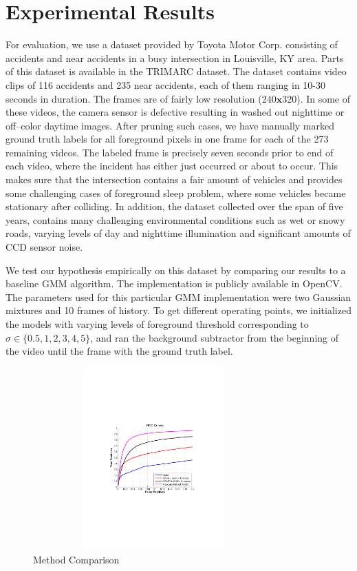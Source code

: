 \documentclass{article}
\begin{document}
\section{Experimental Results}
For evaluation, we use a dataset provided by Toyota Motor Corp. consisting of accidents and near accidents in a busy intersection in Louisville, KY area.  Parts of this dataset is available in the TRIMARC dataset\cite{toyota_dataset}.  The dataset contains video clips of 116 accidents and 235 near accidents, each of them ranging in 10-30 seconds in duration.  The frames are of fairly low resolution (240$\mathbf{x}$320). In some of these videos, the camera sensor is defective resulting in washed out nighttime or off--color daytime images.  After pruning such cases, we have manually marked ground truth labels for all foreground pixels in one frame for each of the 273 remaining videos.  The labeled frame is precisely seven seconds prior to end of each video, where the incident has either just occurred or about to occur.  This makes sure that the intersection contains a fair amount of vehicles and provides some challenging cases of foreground sleep problem, where some vehicles became stationary after colliding.  In addition, the dataset collected over the span of five years, contains many challenging environmental conditions such as wet or snowy roads, varying levels of day and nighttime illumination and significant amounts of CCD sensor noise.

We test our hypothesis empirically on this dataset by comparing our results to a baseline GMM\cite{ZivGMM} algorithm.  The implementation is publicly available in OpenCV\cite{opencv_library}.  The parameters used for this particular GMM implementation were two Gaussian mixtures and 10 frames of history.  To get different operating points, we initialized the models with varying levels of foreground threshold corresponding to $\sigma \in \{0.5, 1, 2, 3, 4, 5\}$, and ran the background subtractor from the beginning of the video until the frame with the ground truth label.

\begin{figure}[htb]
\begin{minipage}[b]{\linewidth}
  \centering
  \centerline{\includegraphics[trim = 35mm 87mm 30mm 87mm, clip,  width=9.25cm, height = 7cm]{Imgs/ROC_comp_curve_zoom.pdf}}
\end{minipage}

\caption{Method Comparison}
\label{fig:roc}
\end{figure}
\end{document}
